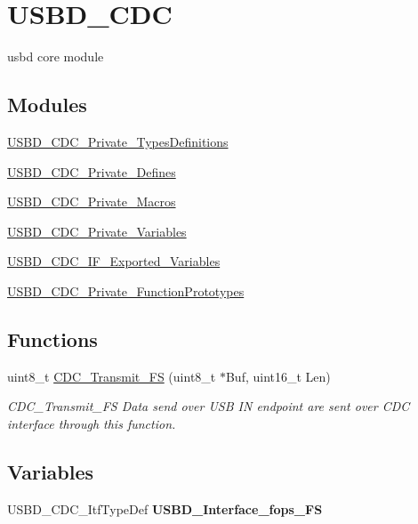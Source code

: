 \hypertarget{group___u_s_b_d___c_d_c}{}\section{U\+S\+B\+D\+\_\+\+C\+DC}
\label{group___u_s_b_d___c_d_c}


usbd core module  


\subsection*{Modules}
\begin{DoxyCompactItemize}
\item 
\hyperlink{group___u_s_b_d___c_d_c___private___types_definitions}{U\+S\+B\+D\+\_\+\+C\+D\+C\+\_\+\+Private\+\_\+\+Types\+Definitions}
\item 
\hyperlink{group___u_s_b_d___c_d_c___private___defines}{U\+S\+B\+D\+\_\+\+C\+D\+C\+\_\+\+Private\+\_\+\+Defines}
\item 
\hyperlink{group___u_s_b_d___c_d_c___private___macros}{U\+S\+B\+D\+\_\+\+C\+D\+C\+\_\+\+Private\+\_\+\+Macros}
\item 
\hyperlink{group___u_s_b_d___c_d_c___private___variables}{U\+S\+B\+D\+\_\+\+C\+D\+C\+\_\+\+Private\+\_\+\+Variables}
\item 
\hyperlink{group___u_s_b_d___c_d_c___i_f___exported___variables}{U\+S\+B\+D\+\_\+\+C\+D\+C\+\_\+\+I\+F\+\_\+\+Exported\+\_\+\+Variables}
\item 
\hyperlink{group___u_s_b_d___c_d_c___private___function_prototypes}{U\+S\+B\+D\+\_\+\+C\+D\+C\+\_\+\+Private\+\_\+\+Function\+Prototypes}
\end{DoxyCompactItemize}
\subsection*{Functions}
\begin{DoxyCompactItemize}
\item 
uint8\+\_\+t \hyperlink{group___u_s_b_d___c_d_c_ga5137d6201dbdef2bf351c5b4941c24f4}{C\+D\+C\+\_\+\+Transmit\+\_\+\+FS} (uint8\+\_\+t $\ast$Buf, uint16\+\_\+t Len)
\begin{DoxyCompactList}\small\item\em C\+D\+C\+\_\+\+Transmit\+\_\+\+FS Data send over U\+SB IN endpoint are sent over C\+DC interface through this function. \end{DoxyCompactList}\end{DoxyCompactItemize}
\subsection*{Variables}
\begin{DoxyCompactItemize}
\item 
U\+S\+B\+D\+\_\+\+C\+D\+C\+\_\+\+Itf\+Type\+Def {\bfseries U\+S\+B\+D\+\_\+\+Interface\+\_\+fops\+\_\+\+FS}
\end{DoxyCompactItemize}


